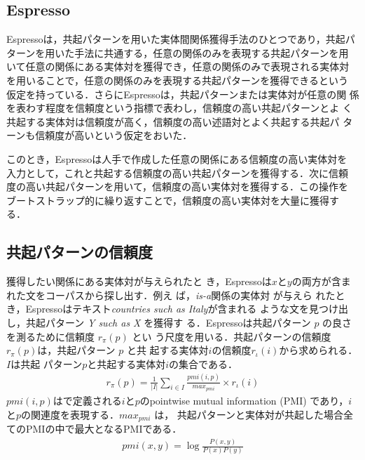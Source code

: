 \documentclass[japanese]{jnlp_1.4}
\begin{document}
\subsection{Espresso}

Espressoは，共起パターンを用いた実体間関係獲得手法のひとつであり，共起パ
ターンを用いた手法に共通する，任意の関係のみを表現する共起パターンを用
いて任意の関係にある実体対を獲得でき，任意の関係のみで表現される実体対
を用いることで，任意の関係のみを表現する共起パターンを獲得できるという
仮定を持っている．さらにEspressoは，共起パターンまたは実体対が任意の関
係を表わす程度を信頼度という指標で表わし，信頼度の高い共起パターンとよ
く共起する実体対は信頼度が高く，信頼度の高い述語対とよく共起する共起パ
ターンも信頼度が高いという仮定をおいた．

このとき，Espressoは人手で作成した任意の関係にある信頼度の高い実体対を
入力として，これと共起する信頼度の高い共起パターンを獲得する．次に信頼
度の高い共起パターンを用いて，信頼度の高い実体対を獲得する．この操作を
ブートストラップ的に繰り返すことで，信頼度の高い実体対を大量に獲得す
る．


\subsection{共起パターンの信頼度}

獲得したい関係にある実体対が与えられたと
き，Espressoは$x$と$y$の両方が含まれた文をコーパスから探し出す．例え
ば，\textsl{is-a}関係の実体対 が与えら
れたとき，Espressoはテキスト\textit{countries such as Italy}が含まれる
ような文を見つけ出し，共起パターン \textit{Y such as X} を獲得す
る．Espressoは共起パターン $p$ の良さを測るために信頼度 $r_\pi(p)$ とい
う尺度を用いる．共起パターンの信頼度$r_\pi(p)$は，共起パターン $p$ と共
起する実体対$i$の信頼度$r_\iota(i)$から求められる．$I$は共起
パターン$p$と共起する実体対$i$の集合である．
\begin{eqnarray}
  \label{eq:rpi}
  r_\pi(p) = 
  \frac{1}{|I|}
  \sum_{i \in I}
  \frac{\mathit{pmi}(i,p)}{\mathit{max}_{pmi}}
  \times r_\iota(i)
\end{eqnarray}
$\mathit{pmi}(i,p)$はで定義される$i$と$p$のpointwise mutual
information (PMI) であり，$i$と$p$の関連度を表現する．$max_{pmi}$ は，
共起パターンと実体対が共起した場合全てのPMIの中で最大となるPMIである．
\begin{eqnarray}
  \label{eq:pmi}
  \mathit{pmi}(x, y) = \log\frac{P(x,y)}{P(x)P(y)}
\end{eqnarray}
\end{document}
